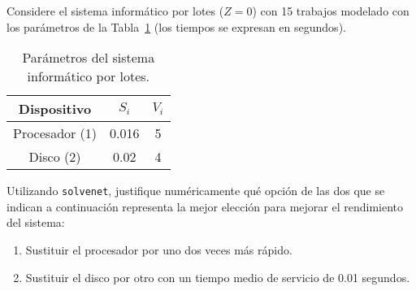\begin{comment}
\solucion
    \begin{enumerate}
        \item El tiempo de reflexión es $Z = 5$ segundos.
        \item El tiempo mínimo de respuesta es $0.49$ segundos.
        \item El punto teórico de saturación es $N_T^* = 25$ clientes.
        \item El tiempo medio de respuesta esperable es de poco más de $17$ segundos.
        \item No, porque al haber más clientes que el límite teórico de saturación, ya seguro que hay colas en, al menos, el cuello de botella por lo que nunca se podría conseguir el tiempo de respuesta mínimo que precisamente es de $0.49$ segundos.
    \end{enumerate}
\end{comment}

\begin{ejercicio}\label{ej:5.19}
    Considere el sistema informático por lotes ($Z = 0$) con 15 trabajos modelado con los parámetros de la Tabla~\ref{tab:5.19}
    (los tiempos se expresan en segundos).
    \begin{table}[h]
        \centering
        \begin{tabular}{|c|c|c|}
            \hline
            Dispositivo & $S_i$ & $V_i$ \\
            \hline
            Procesador (1) & 0.016 & 5 \\
            Disco (2) & 0.02 & 4 \\
            \hline
        \end{tabular}
        \caption{Parámetros del sistema informático por lotes.}
        \label{tab:5.19}
    \end{table}
    Utilizando \verb|solvenet|, justifique numéricamente qué opción de las dos que se indican a continuación representa la mejor elección para mejorar el rendimiento del sistema:
    \begin{enumerate}
        \item Sustituir el procesador por uno dos veces más rápido.
        \item Sustituir el disco por otro con un tiempo medio de servicio de 0.01 segundos.
    \end{enumerate}
\end{ejercicio}
\begin{comment}
\solucion
    Ambas opciones sobre el sistema ofrecen el mismo grado de mejora en el rendimiento del sistema. Se trata de un sistema equilibrado (todas los dispositivos tienen la misma demanda de servicio). Se debe comprobar mediante \verb|solvenet| que tanto el tiempo de respuesta del servidor, como su productividad como los límites asintóticos son los mismos con ambas mejoras. Nótese que, sin embargo, el punto teórico de saturación (knee point) es menor en ambos casos que el del sistema original sin mejora.
\end{comment}

